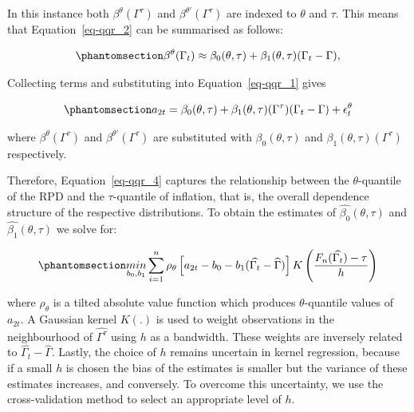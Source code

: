 \documentclass[
  letterpaper,
  DIV=11,
  numbers=noendperiod]{scrartcl}
\begin{document}
In this instance both \(\beta^\theta(\Gamma^\tau)\) and
\(\beta^{\theta'}(\Gamma^\tau)\) are indexed to \(\theta\) and \(\tau\).
This means that Equation~\ref{eq-qqr_2} can be summarised as follows:

\begin{equation}\phantomsection\label{eq-qqr_3}{
    \beta^\theta(\Gamma_t) \approx \beta_0(\theta, \tau) + \beta_1(\theta, \tau)(\Gamma_t - \Gamma),
}\end{equation}

Collecting terms and substituting into Equation~\ref{eq-qqr_1} gives

\begin{equation}\phantomsection\label{eq-qqr_4}{
a_{2t} =  \beta_0(\theta, \tau) + \beta_1(\theta, \tau)(\Gamma^\tau)(\Gamma_t - \Gamma) + \epsilon_{t}^\theta
}\end{equation}

where \(\beta^\theta(\Gamma^\tau)\) and \(\beta^{\theta'}(\Gamma^\tau)\)
are substituted with \(\beta_0(\theta, \tau)\) and
\(\beta_1(\theta, \tau)(\Gamma^\tau)\) respectively.

Therefore, Equation~\ref{eq-qqr_4} captures the relationship between the
\(\theta\)-quantile of the RPD and the \(\tau\)-quantile of inflation,
that is, the overall dependence structure of the respective
distributions. To obtain the estimates of
\(\hat{\beta_0}(\theta, \tau)\) and \(\hat{\beta_1}(\theta, \tau)\) we
solve for:

\begin{equation}\phantomsection\label{eq-qqr_5}{
    \underset{b_0, b_1}{min}\sum_{i=1}^n\rho_{\theta}\left[a_{2t} - b_0 - b_1(\widehat{\Gamma_t} - \widehat{\Gamma}) \right]K\left(\dfrac{F_n(\widehat{\Gamma_t}) - \tau}{h}\right)
}\end{equation}

where \(\rho_{\theta}\) is a tilted absolute value function which
produces \(\theta\)-quantile values of \(a_{2t}\). A Gaussian kernel
\(K(.)\) is used to weight observations in the neighbourhood of
\(\widehat{\Gamma^\tau}\) using \(h\) as a bandwidth. These weights are
inversely related to \(\widehat{\Gamma_t} - \widehat{\Gamma}\). Lastly,
the choice of \(h\) remains uncertain in kernel regression, because if a
small \(h\) is chosen the bias of the estimates is smaller but the
variance of these estimates increases, and conversely. To overcome this
uncertainty, we use the cross-validation method to select an appropriate
level of \(h\).
\end{document}
